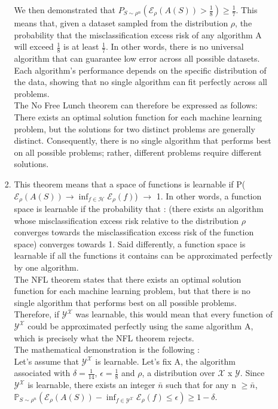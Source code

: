 \documentclass[final,3p,times,12pt]{article}
\begin{document}
\begin{enumerate}
\begin{enumerate}
\begin{enumerate}
    We then demonstrated that $P_{S \sim \rho^n}( \mathcal{E}_{\rho}(A(S)) > \frac{1}{8}) \geq \frac{1}{7}$. This means that, given a dataset sampled from the distribution $\rho$, the probability that the misclassification excess risk of any algorithm A will exceed $\frac{1}{8}$ is at least $\frac{1}{7}$. In other words, there is no universal algorithm that can guarantee low error across all possible datasets. Each algorithm’s performance depends on the specific distribution of the data, showing that no single algorithm can fit perfectly across all problems.\\
    
    The No Free Lunch theorem can therefore be expressed as follows: There exists an optimal solution function for each machine learning problem, but the solutions for two distinct problems are generally distinct. Consequently, there is no single algorithm that performs best on all possible problems; rather, different problems require different solutions. \\

    \item This theorem means that a space of functions is learnable if P($\mathcal{E}_{\rho}(A(S)) \rightarrow \inf_{f \in \mathcal{H}}\mathcal{E}_{\rho}(f)$) $\rightarrow$ 1. In other words, a function space is learnable if the probability that : (there exists an algorithm whose misclassification excess risk relative to the distribution $\rho$ converges towards the misclassification excess risk of the function space) converges towards 1. Said differently, a function space is learnable if all the functions it contains can be approximated perfectly by one algorithm.\\

The NFL theorem states that there exists an optimal solution function for each machine learning problem, but that there is no single algorithm that performs best on all possible problems. Therefore, if $\mathcal{Y}^{\mathcal{X}}$ was learnable, this would mean that every function of $\mathcal{Y}^{\mathcal{X}}$ could be approximated perfectly using the same algorithm A, which is precisely what the NFL theorem rejects. \\

The mathematical demonstration is the following : \\

Let's assume that $\mathcal{Y}^{\mathcal{X}}$ is learnable. Let's fix A, the algorithm associated with $\delta = \frac{1}{14}$, $\epsilon = \frac{1}{8}$ and $\rho$, a distribution over $\mathcal{X}$ x $ \mathcal{Y}$. Since $\mathcal{Y}^{\mathcal{X}}$ is learnable, there exists an integer $\bar{n}$
such that for any n $\geq\bar{n}$,  $\mathbb{P}_{S \sim \rho^n} \left( \mathcal{E}_\rho(A(S)) - \inf_{f \in \mathcal{Y}^{\mathcal{X}}} \mathcal{E}_\rho(f) \leq \epsilon \right) \geq 1 - \delta$. \\


\end{enumerate}
\end{enumerate}
\end{enumerate}
\end{document}
